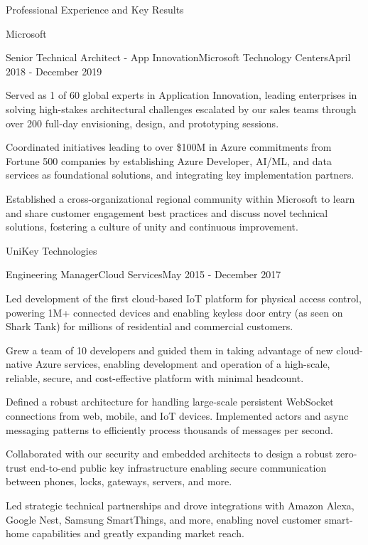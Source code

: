 \documentclass{resume} %
\begin{document}
\begin{rSection}{Professional Experience and Key Results}
\begin{rCompany}{Microsoft}{}{}
    \begin{rRole}{Senior Technical Architect - App Innovation}{Microsoft Technology Centers}{April 2018 - December 2019}
        \item Served as 1 of 60 global experts in Application Innovation, leading enterprises in solving high-stakes architectural challenges escalated by our sales teams through over 200 full-day envisioning, design, and prototyping sessions. 
        \item Coordinated initiatives leading to over \$100M in Azure commitments from Fortune 500 companies by establishing Azure Developer, AI/ML, and data services as foundational solutions, and integrating key implementation partners.
        \item Established a cross-organizational regional community within Microsoft to learn and share customer engagement best practices and discuss novel technical solutions, fostering a culture of unity and continuous improvement.
    \end{rRole}
  \end{rCompany}

  \begin{rCompany}{UniKey Technologies}{}{}
    \begin{rRole}{Engineering Manager}{Cloud Services}{May 2015 - December 2017}
      \item Led development of the first cloud-based IoT platform for physical access control, powering 1M+ connected devices and enabling keyless door entry (as seen on Shark Tank) for millions of residential and commercial customers.
      \item Grew a team of 10 developers and guided them in taking advantage of new cloud-native Azure services, enabling development and operation of a high-scale, reliable, secure, and cost-effective platform with minimal headcount.
      \item Defined a robust architecture for handling large-scale persistent WebSocket connections from web, mobile, and IoT devices. Implemented actors and async messaging patterns to efficiently process thousands of messages per second.
      \item Collaborated with our security and embedded architects to design a robust zero-trust end-to-end public key infrastructure enabling secure communication between phones, locks, gateways, servers, and more.
      \item Led strategic technical partnerships and drove integrations with Amazon Alexa, Google Nest, Samsung SmartThings, and more, enabling novel customer smart-home capabilities and greatly expanding market reach.
    \end{rRole}
  \end{rCompany}


\end{rSection}
\end{document}
